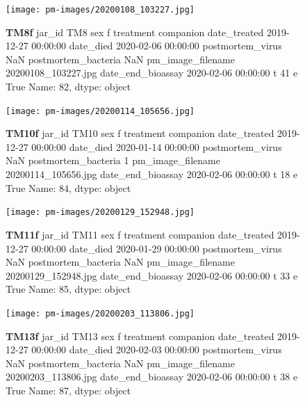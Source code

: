 \begin{figure}[h!]
\centering
\texttt{[image: pm-images/20200108\_103227.jpg]}
\caption{\textbf{TM8f} jar\_id                                 TM8
sex                                      f
treatment                        companion
date\_treated           2019-12-27 00:00:00
date\_died              2020-02-06 00:00:00
postmortem\_virus                       NaN
postmortem\_bacteria                    NaN
pm\_image\_filename      20200108\_103227.jpg
date\_end\_bioassay      2020-02-06 00:00:00
t                                       41
e                                     True
Name: 82, dtype: object}
\end{figure}
\clearpage

\begin{figure}[h!]
\centering
\texttt{[image: pm-images/20200114\_105656.jpg]}
\caption{\textbf{TM10f} jar\_id                                TM10
sex                                      f
treatment                        companion
date\_treated           2019-12-27 00:00:00
date\_died              2020-01-14 00:00:00
postmortem\_virus                       NaN
postmortem\_bacteria                      1
pm\_image\_filename      20200114\_105656.jpg
date\_end\_bioassay      2020-02-06 00:00:00
t                                       18
e                                     True
Name: 84, dtype: object}
\end{figure}
\clearpage

\begin{figure}[h!]
\centering
\texttt{[image: pm-images/20200129\_152948.jpg]}
\caption{\textbf{TM11f} jar\_id                                TM11
sex                                      f
treatment                        companion
date\_treated           2019-12-27 00:00:00
date\_died              2020-01-29 00:00:00
postmortem\_virus                       NaN
postmortem\_bacteria                    NaN
pm\_image\_filename      20200129\_152948.jpg
date\_end\_bioassay      2020-02-06 00:00:00
t                                       33
e                                     True
Name: 85, dtype: object}
\end{figure}
\clearpage

\begin{figure}[h!]
\centering
\texttt{[image: pm-images/20200203\_113806.jpg]}
\caption{\textbf{TM13f} jar\_id                                TM13
sex                                      f
treatment                        companion
date\_treated           2019-12-27 00:00:00
date\_died              2020-02-03 00:00:00
postmortem\_virus                       NaN
postmortem\_bacteria                    NaN
pm\_image\_filename      20200203\_113806.jpg
date\_end\_bioassay      2020-02-06 00:00:00
t                                       38
e                                     True
Name: 87, dtype: object}
\end{figure}
\clearpage

